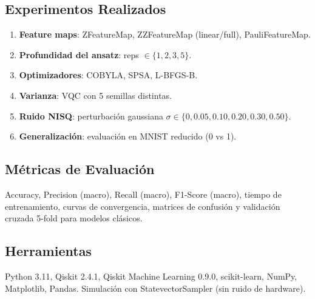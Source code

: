 \subsection{Experimentos Realizados}
\begin{enumerate}
    \item \textbf{Feature maps}: ZFeatureMap, ZZFeatureMap (linear/full), PauliFeatureMap.
    \item \textbf{Profundidad del ansatz}: reps $\in \{1, 2, 3, 5\}$.
    \item \textbf{Optimizadores}: COBYLA, SPSA, L-BFGS-B.
    \item \textbf{Varianza}: VQC con 5 semillas distintas.
    \item \textbf{Ruido NISQ}: perturbaci\'on gaussiana $\sigma \in \{0, 0.05, 0.10, 0.20, 0.30, 0.50\}$.
    \item \textbf{Generalizaci\'on}: evaluaci\'on en MNIST reducido (0 vs 1).
\end{enumerate}

\subsection{M\'etricas de Evaluaci\'on}
Accuracy, Precision (macro), Recall (macro), F1-Score (macro), tiempo de entrenamiento, curvas de convergencia, matrices de confusi\'on y validaci\'on cruzada 5-fold para modelos cl\'asicos.

\subsection{Herramientas}
Python 3.11, Qiskit 2.4.1, Qiskit Machine Learning 0.9.0, scikit-learn, NumPy, Matplotlib, Pandas. Simulaci\'on con StatevectorSampler (sin ruido de hardware).
